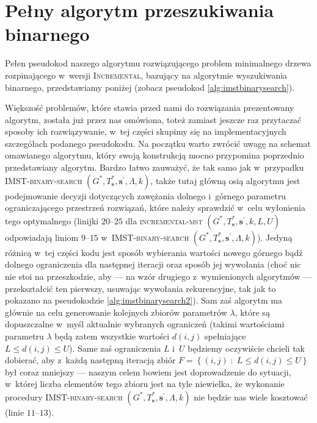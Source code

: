 



\section{Pełny algorytm przeszukiwania binarnego}




Pełen pseudokod naszego algorytmu rozwiązującego problem minimalnego drzewa rozpinającego w~wersji \textsc{Incremental}, bazujący na algorytmie wyszukiwania binarnego, przedstawiamy poniżej (zobacz pseudokod \ref{alg:imstbinarysearch}).





















Większość problemów, które stawia przed nami do rozwiązania prezentowany algorytm, została już przez nas omówiona, toteż zamiast jeszcze raz przytaczać sposoby ich rozwiązywanie, w~tej części skupimy się na implementacyjnych szczegółach podanego pseudokodu. Na początku warto zwrócić uwagę na schemat omawianego algorytmu, który swoją konstrukcją mocno przypomina poprzednio przedstawiany algorytm. Bardzo łatwo zauważyć, że tak samo jak w~przypadku \textsc{IMST-binary-search} $\left( G^{\ast}, T^{\ast}_{\textbf{s}}, \textbf{s}^{\prime}, \Lambda, k \right)$, także tutaj główną osią algorytmu jest podejmowanie decyzji dotyczących zawężania dolnego i~górnego parametru ograniczającego przestrzeń rozwiązań, które należy sprawdzić w~celu wyłonienia tego optymalnego (linijki $20$--$25$ dla \textsc{incremental-mst} $\left( G^{\ast}, T^{\ast}_{\textbf{s}}, \textbf{s}^{\prime}, k, L, U \right)$ odpowiadają liniom $9$--$15$ w~\textsc{IMST-binary-search} $\left( G^{\ast}, T^{\ast}_{\textbf{s}}, \textbf{s}^{\prime}, \Lambda, k \right)$). Jedyną różnicą w~tej części kodu jest sposób wybierania wartości nowego górnego bądź dolnego ograniczenia dla następnej iteracji oraz sposób jej wywołania (choć nic nie stoi na przeszkodzie, aby --- na wzór drugiego z~wymienionych algorytmów --- przekształcić ten pierwszy, usuwając wywołania rekurencyjne, tak jak to pokazano na pseudokodzie \ref{alg:imstbinarysearch2}). Sam zaś algorytm ma głównie na celu generowanie kolejnych zbiorów parametrów $\lambda$, które są dopuszczalne w~myśl aktualnie wybranych ograniczeń (takimi wartościami parametru $\lambda$ będą zatem wszystkie wartości $d \left( i, j \right)$ spełniające $L \leqslant d \left( i, j \right) \leqslant U$). Same zaś ograniczenia $L$ i~$U$ będziemy oczywiście chcieli tak dobierać, aby z~każdą następną iteracją zbiór $F = \left\{ \left( i, j \right) \; : \; L \leqslant d \left( i, j \right) \leqslant U \right\}$ był coraz mniejszy --- naszym celem bowiem jest doprowadzenie do sytuacji, w~której liczba elementów tego zbioru jest na tyle niewielka, że wykonanie procedury \textsc{IMST-binary-search} $\left( G^{\ast}, T^{\ast}_{\textbf{s}}, \textbf{s}^{\prime}, \Lambda, k \right)$ nie będzie nas wiele kosztować (linie $11$--$13$). 

